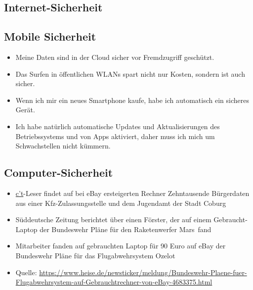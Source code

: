 \subsection{Internet-Sicherheit}



\subsection{Mobile Sicherheit}

\begin{frame}
\begin{itemize}
	\item Meine Daten sind in der Cloud sicher vor Fremdzugriff geschützt.
	\item Das Surfen in öffentlichen WLANs spart nicht nur Kosten, sondern ist auch sicher.
	\item Wenn ich mir ein neues Smartphone kaufe, habe ich automatisch ein sicheres Gerät.
	\item Ich habe natürlich automatische Updates und Aktualisierungen des Betriebssystems und von Apps aktiviert, daher muss ich mich um Schwachstellen nicht kümmern.
\end{itemize}
\end{frame}

\subsection{Computer-Sicherheit}


\begin{frame}
\begin{itemize}
	\item \href{https://www.heise.de/ct/}{c't}-Leser findet auf bei eBay ersteigerten Rechner Zehntausende Bürgerdaten aus einer Kfz-Zulassungsstelle und dem Jugendamt der Stadt Coburg
	\item Süddeutsche Zeitung berichtet über einen Förster, der auf einem Gebraucht-Laptop der Bundeswehr Pläne für den Raketenwerfer \glqq Mars\grqq\ fand
	\item Mitarbeiter fanden auf gebrauchten Laptop für 90 Euro auf eBay der Bundeswehr Pläne für das Flugabwehrsystem \glqq Ozelot\grqq
	\item \scriptsize{Quelle: \href{https://www.heise.de/newsticker/meldung/Bundeswehr-Plaene-fuer-Flugabwehrsystem-auf-Gebrauchtrechner-von-eBay-4683375.html}{https://www.heise.de/newsticker/meldung/Bundeswehr-Plaene-fuer-Flugabwehrsystem-auf-Gebrauchtrechner-von-eBay-4683375.html}}
\end{itemize}
\end{frame}

